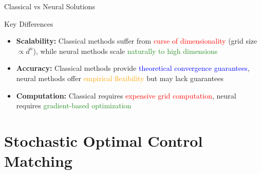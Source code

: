 \documentclass[aspectratio=169,xcolor=dvipsnames]{beamer}
\begin{document}
\begin{frame}{Classical vs Neural Solutions}
    \vspace{0.3cm}
    
    \begin{block}{Key Differences}
        \begin{itemize}
            \item \textbf{Scalability:} Classical methods suffer from \textcolor{red}{curse of dimensionality} (grid size $\propto d^n$), while neural methods scale \textcolor{ForestGreen}{naturally to high dimensions}
            
            \item \textbf{Accuracy:} Classical methods provide \textcolor{blue}{theoretical convergence guarantees}, neural methods offer \textcolor{orange}{empirical flexibility} but may lack guarantees
            
            \item \textbf{Computation:} Classical requires \textcolor{red}{expensive grid computation}, neural requires \textcolor{ForestGreen}{gradient-based optimization}
        \end{itemize}
    \end{block}

\end{frame}

\section{Stochastic Optimal Control Matching}
\end{document}
